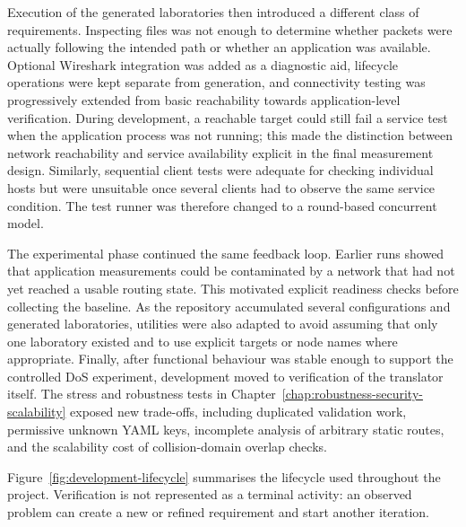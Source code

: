 Execution of the generated laboratories then introduced a different class of
requirements. Inspecting files was not enough to determine whether packets were
actually following the intended path or whether an application was available.
Optional Wireshark integration was added as a diagnostic aid, lifecycle
operations were kept separate from generation, and connectivity testing was
progressively extended from basic reachability towards application-level
verification. During development, a reachable target could still fail a service
test when the application process was not running; this made the distinction
between network reachability and service availability explicit in the final
measurement design. Similarly, sequential client tests were adequate for
checking individual hosts but were unsuitable once several clients had to
observe the same service condition. The test runner was therefore changed to a
round-based concurrent model.

The experimental phase continued the same feedback loop. Earlier runs showed
that application measurements could be contaminated by a network that had not
yet reached a usable routing state. This motivated explicit readiness checks
before collecting the baseline. As the repository accumulated several
configurations and generated laboratories, utilities were also adapted to avoid
assuming that only one laboratory existed and to use explicit targets or node
names where appropriate. Finally, after functional behaviour was stable enough
to support the controlled DoS experiment, development moved to verification of
the translator itself. The stress and robustness tests in
Chapter~\ref{chap:robustness-security-scalability} exposed new trade-offs,
including duplicated validation work, permissive unknown YAML keys, incomplete
analysis of arbitrary static routes, and the scalability cost of collision-domain
overlap checks.

Figure~\ref{fig:development-lifecycle} summarises the lifecycle used throughout
the project. Verification is not represented as a terminal activity: an
observed problem can create a new or refined requirement and start another
iteration.

